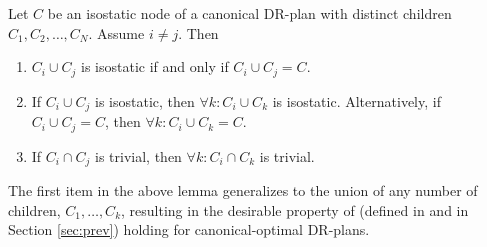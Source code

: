 \begin{lemma*}
\label{lemma:combined_lemma}
    Let $C$ be an isostatic node of a canonical DR-plan with distinct children $C_1,C_2,\ldots, C_N$. Assume $i\ne j$.
    Then
    \begin{enumerate}
        \item\label{lemma:wc_intersection_is_C}
        $C_i\cup C_j$ is isostatic if and only if $C_i\cup C_j = C$.

        \item\label{lemma:wc_intersection_makes_all_wc}
        If $C_i\cup C_j$ is isostatic, then $\forall k: C_i\cup C_k$ is isostatic. Alternatively, if $C_i\cup C_j=C$, then $\forall k: C_i\cup C_k=C$.

        \item\label{lemma:uc_intersection_makes_all_uc}
        If $C_i\cap C_j$ is trivial, then $\forall k: C_i\cap C_k$ is trivial.
    \end{enumerate}
\end{lemma*}

\begin{remark}
    The first item in the above lemma generalizes to the union of any number of children, $C_1,\ldots,C_k$, resulting in the desirable property of  (defined in \cite{hoffman2001decompositionI} and in Section \ref{sec:prev}) holding for canonical-optimal DR-plans.
\end{remark}





%     
%     



